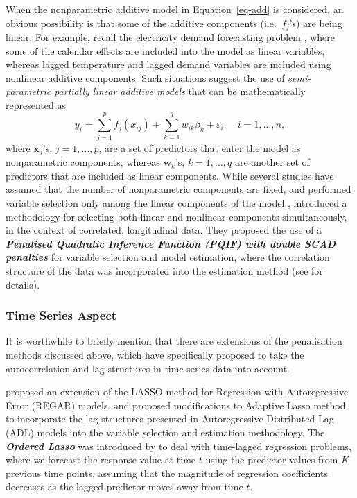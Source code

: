 \documentclass[11pt,a4paper,]{article}
\begin{document}
When the nonparametric additive model in Equation~\ref{eq-add} is
considered, an obvious possibility is that some of the additive
components (i.e.~\(f_{j}\)'s) are being linear. For example, recall the
electricity demand forecasting problem \autocite{HF2010,FH2012}, where
some of the calendar effects are included into the model as linear
variables, whereas lagged temperature and lagged demand variables are
included using nonlinear additive components. Such situations suggest
the use of \emph{semi-parametric partially linear additive models} that
can be mathematically represented as \[
 y_{i} = \sum_{j=1}^{p} {f_{j}(x_{ij})} + \sum_{k=1}^{q} {w_{ik}\beta_{k}} + \varepsilon_{i}, \quad i = 1, \dots, n,
\] where \(\bm{x}_{j}\)'s, \(j = 1, \dots, p\), are a set of predictors
that enter the model as nonparametric components, whereas
\(\bm{w}_{k}\)'s, \(k = 1, \dots, q\) are another set of predictors that
are included as linear components. While several studies have assumed
that the number of nonparametric components are fixed, and performed
variable selection only among the linear components of the model
\autocite{Lian2012,Guo2013,Liu2011}, \textcite{Wang2014} introduced a
methodology for selecting both linear and nonlinear components
simultaneously, in the context of correlated, longitudinal data. They
proposed the use of a \textbf{\emph{Penalised Quadratic Inference
Function (PQIF) with double SCAD penalties}} for variable selection and
model estimation, where the correlation structure of the data was
incorporated into the estimation method (see \textcite{Wang2014} for
details).

\hypertarget{time-series-aspect}{%
\subsubsection{Time Series Aspect}\label{time-series-aspect}}

It is worthwhile to briefly mention that there are extensions of the
penalisation methods discussed above, which have specifically proposed
to take the autocorrelation and lag structures in time series data into
account.

\textcite{Wang2007} proposed an extension of the LASSO method for
Regression with Autoregressive Error (REGAR) models. \textcite{Park2013}
and \textcite{Konzen2016} proposed modifications to Adaptive Lasso
method to incorporate the lag structures presented in Autoregressive
Distributed Lag (ADL) models into the variable selection and estimation
methodology. The \textbf{\emph{Ordered Lasso}} was introduced by
\textcite{Tibshirani2016} to deal with time-lagged regression problems,
where we forecast the response value at time \(t\) using the predictor
values from \(K\) previous time points, assuming that the magnitude of
regression coefficients decreases as the lagged predictor moves away
from time \(t\).
\end{document}

